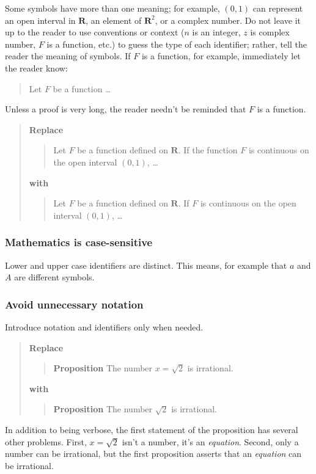 \documentclass[12pt,fleqn]{article}
\newcounter{ex}\setcounter{ex}{0}
\newcounter{id}\setcounter{id}{0}
\newcounter{se}\setcounter{se}{0}
\begin{document}
Some symbols have more than one meaning; for example, $(0,1)$ can
represent an open interval in $\mathbf{R}$, an element of
\(\mathbf{R}^2\), or a complex number.  Do not leave it up to the reader
to use conventions or context (\(n\) is an integer, \(z\) is complex
number, \(F\) is a function, etc.) to guess the type of each
identifier; rather, tell the reader the meaning of symbols.  If $F$ is
a function, for example, immediately let the reader know:
\begin{quote}
   Let $F$ be a function \dots
\end{quote}
Unless a proof is very long, the reader needn't be reminded that
$F$ is a function. 
\begin{quote}
\textbf{\textbf{Replace}}
\begin{quote}
  Let $F$ be a function defined on $\mathbf{R}$.  If the function $F$ is continuous on
  the open interval $(0,1)$,  \dots
\end{quote}
\textbf{with}
\begin{quote}
  Let \(F\) be a function defined on \(\mathbf{R}\).  If \(F\) is continuous on
  the open interval \((0,1)\), \dots
\end{quote}
\end{quote}

 \subsubsection{ Mathematics is case-sensitive}

Lower and upper case identifiers are distinct.  This means, for
example that \(a\) and \(A\) are different symbols.

 \subsubsection{  Avoid unnecessary notation}

Introduce notation and identifiers only when needed. 
\begin{quote}
\textbf{Replace}
\begin{quote}
 \textbf {Proposition} The number \(x = \sqrt{2}\) is irrational.
\end{quote}
\textbf{with}
\begin{quote}
\textbf{Proposition} The number \(\sqrt{2}\) is irrational.
\end{quote}
\end{quote}
In addition to being verbose, the first statement of the 
proposition has several other problems. First, \(x = \sqrt{2}\) isn't 
a number, it's an  {\em equation}. Second, only a number can be 
irrational, but the first proposition asserts that an {\em equation\/}
can be irrational. 
\end{document}
